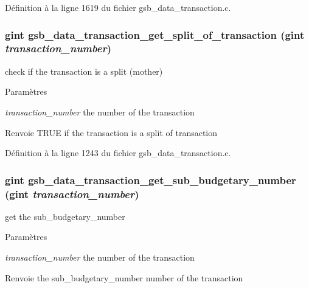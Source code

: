 Définition à la ligne 1619 du fichier gsb\_\-data\_\-transaction.c.

\subsubsection[{gsb\_\-data\_\-transaction\_\-get\_\-split\_\-of\_\-transaction}]{\setlength{\rightskip}{0pt plus 5cm}gint gsb\_\-data\_\-transaction\_\-get\_\-split\_\-of\_\-transaction (gint {\em transaction\_\-number})}\label{gsb__data__transaction_8h_a2de1ba38ee196b44e3c00c10e1d645cc}
check if the transaction is a split (mother)


\begin{DoxyParams}{Paramètres}
\item[{\em transaction\_\-number}]the number of the transaction\end{DoxyParams}
\begin{DoxyReturn}{Renvoie}
TRUE if the transaction is a split of transaction 
\end{DoxyReturn}


Définition à la ligne 1243 du fichier gsb\_\-data\_\-transaction.c.

\subsubsection[{gsb\_\-data\_\-transaction\_\-get\_\-sub\_\-budgetary\_\-number}]{\setlength{\rightskip}{0pt plus 5cm}gint gsb\_\-data\_\-transaction\_\-get\_\-sub\_\-budgetary\_\-number (gint {\em transaction\_\-number})}\label{gsb__data__transaction_8h_a44dbcf1f953a233d0038027289aa2372}
get the sub\_\-budgetary\_\-number 
\begin{DoxyParams}{Paramètres}
\item[{\em transaction\_\-number}]the number of the transaction \end{DoxyParams}
\begin{DoxyReturn}{Renvoie}
the sub\_\-budgetary\_\-number number of the transaction 
\end{DoxyReturn}


